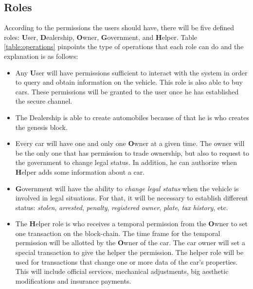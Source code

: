\subsection{Roles}

According to the permissions the users should have, there will be five defined roles: 
\textbf{U}ser,
\textbf{D}ealership,
\textbf{O}wner,
\textbf{G}overnment, and
\textbf{H}elper.
Table \ref{table:operations} pinpoints the type of operations that each role can do and the explanation
is as follows: 
\begin{itemize}
    \item Any \textbf{U}ser will have permissions sufficient to interact with the system in order to 
        query and obtain information on the     vehicle. This role is also able to buy cars. 
        These permissions will be granted to the user once he has established the secure channel. 
    \item The {D}ealership is able to create automobiles because of that he is who creates the 
        genesis block.
    \item Every car will have one and only one \textbf{O}wner at a given time. The owner will be the only one 
        that has permission to trade ownership, but also to request to the government to change legal
        status. In addition, he can authorize when \textbf{H}elper adds some information about a car.
    \item \textbf{G}overnment will have the ability to  \textit{change legal status} when the 
        vehicle is involved in legal situations. For that, it will be necessary to establish 
        different status: \textit{stolen}, \textit{arrested}, \textit{penalty}, \textit{registered owner}, \textit{plate}, 
        \textit{tax history}, etc.
    \item The \textbf{H}elper role is who receives a temporal permission from the \textbf{O}wner to set one 
        transaction on the block-chain. The time frame for the temporal permission will be allotted by 
        the \textbf{O}wner of the car. The car owner will set a special transaction to give the helper 
        the permission. The helper role will be used for transactions that change one or more data of the 
        car's properties. This will include official services, mechanical adjustments, big aesthetic 
        modifications and insurance payments.
\end{itemize}







